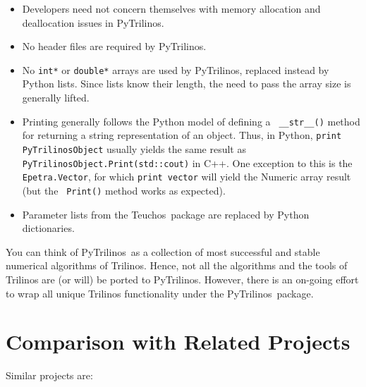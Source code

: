 \documentclass[10pt,relax]{SANDreport}
\newcommand{\PyTrilinos}{{PyTrilinos}}
\newcommand{\teuchos}{{Teuchos}}
\begin{document}
\begin{itemize}

\item Developers need not concern themselves with memory allocation
  and deallocation issues in \PyTrilinos.

\item No header files are required by \PyTrilinos.

\item No {\tt int*} or {\tt double*} arrays are used by \PyTrilinos,
  replaced instead by Python lists.  Since lists know their length,
  the need to pass the array size is generally lifted.

\item Printing generally follows the Python model of defining a {\tt
  \_\_str\_\_()} method for returning a string representation of an
  object.  Thus, in Python, {\tt print PyTrilinosObject} usually
  yields the same result as {\tt PyTrilinosObject.Print(std::cout)} in
  C++.  One exception to this is the {\tt Epetra.Vector}, for which
  {\tt print vector} will yield the Numeric array result (but the {\tt
    Print()} method works as expected).

\item Parameter lists from the \teuchos\ package are replaced by Python
  dictionaries.

\end{itemize}

You can think of \PyTrilinos\ as a collection of most successful and
stable numerical algorithms of Trilinos.  Hence, not all the
algorithms and the tools of Trilinos are (or will) be ported to
\PyTrilinos.  However, there is an on-going effort to wrap all unique
Trilinos functionality under the \PyTrilinos\ package.

\section{Comparison with Related Projects}
\label{sec:comparison}

Similar projects are:
\end{document}
